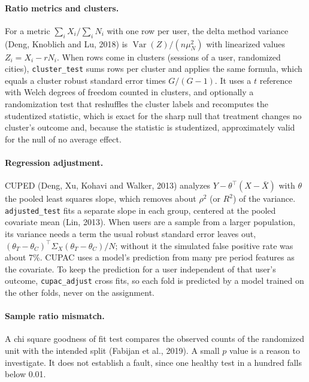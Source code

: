 \documentclass[10pt]{article}
\begin{document}
\paragraph{Ratio metrics and clusters.} For a metric $\sum_i X_i / \sum_i N_i$ with one row per user, the delta method variance (Deng, Knoblich and Lu, 2018) is $\operatorname{Var}(Z)/(n \mu_N^2)$ with linearized values $Z_i = X_i - r N_i$. When rows come in clusters (sessions of a user, randomized cities), \texttt{cluster\_test} sums rows per cluster and applies the same formula, which equals a cluster robust standard error times $G/(G-1)$. It uses a $t$ reference with Welch degrees of freedom counted in clusters, and optionally a randomization test that reshuffles the cluster labels and recomputes the studentized statistic, which is exact for the sharp null that treatment changes no cluster's outcome and, because the statistic is studentized, approximately valid for the null of no average effect.

\paragraph{Regression adjustment.} CUPED (Deng, Xu, Kohavi and Walker, 2013) analyzes $Y - \theta^\top(X - \bar X)$ with $\theta$ the pooled least squares slope, which removes about $\rho^2$ (or $R^2$) of the variance. \texttt{adjusted\_test} fits a separate slope in each group, centered at the pooled covariate mean (Lin, 2013). When users are a sample from a larger population, its variance needs a term the usual robust standard error leaves out, $(\theta_T - \theta_C)^\top \Sigma_X (\theta_T - \theta_C)/N$; without it the simulated false positive rate was about 7\%. CUPAC uses a model's prediction from many pre period features as the covariate. To keep the prediction for a user independent of that user's outcome, \texttt{cupac\_adjust} cross fits, so each fold is predicted by a model trained on the other folds, never on the assignment.

\paragraph{Sample ratio mismatch.} A chi square goodness of fit test compares the observed counts of the randomized unit with the intended split (Fabijan et al., 2019). A small $p$ value is a reason to investigate. It does not establish a fault, since one healthy test in a hundred falls below 0.01.
\end{document}
